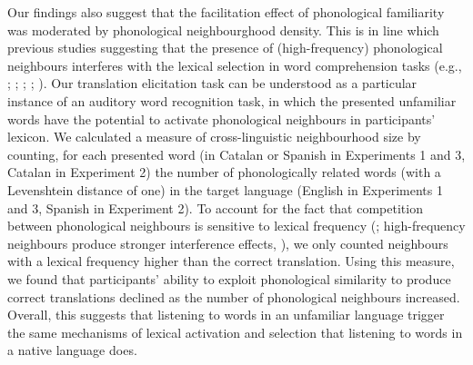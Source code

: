 \documentclass[
]{article}
\begin{document}
Our findings also suggest that the facilitation effect of phonological
familiarity was moderated by phonological neighbourghood density. This
is in line which previous studies suggesting that the presence of
(high-frequency) phonological neighbours interferes with the lexical
selection in word comprehension tasks (e.g.,
;
;
;
;
). Our
translation elicitation task can be understood as a particular instance
of an auditory word recognition task, in which the presented unfamiliar
words have the potential to activate phonological neighbours in
participants' lexicon. We calculated a measure of cross-linguistic
neighbourhood size by counting, for each presented word (in Catalan or
Spanish in Experiments 1 and 3, Catalan in Experiment 2) the number of
phonologically related words (with a Levenshtein distance of one) in the
target language (English in Experiments 1 and 3, Spanish in Experiment
2). To account for the fact that competition between phonological
neighbours is sensitive to lexical frequency
(;
high-frequency neighbours produce stronger interference effects,
), we only
counted neighbours with a lexical frequency higher than the correct
translation. Using this measure, we found that participants' ability to
exploit phonological similarity to produce correct translations declined
as the number of phonological neighbours increased. Overall, this
suggests that listening to words in an unfamiliar language trigger the
same mechanisms of lexical activation and selection that listening to
words in a native language does.
\end{document}
